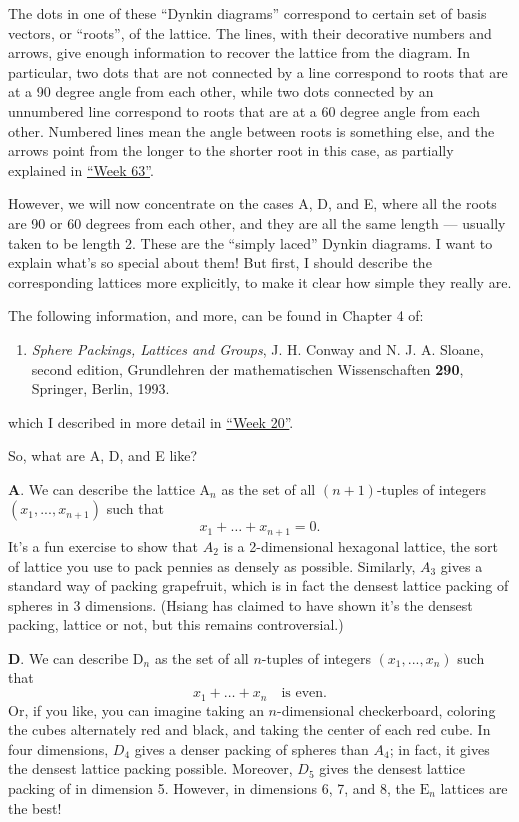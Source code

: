 \documentclass{article}
\def\tightlist{}
\begin{document}
The dots in one of these ``Dynkin diagrams'' correspond to certain set
of basis vectors, or ``roots'', of the lattice. The lines, with their
decorative numbers and arrows, give enough information to recover the
lattice from the diagram. In particular, two dots that are not connected
by a line correspond to roots that are at a 90 degree angle from each
other, while two dots connected by an unnumbered line correspond to
roots that are at a 60 degree angle from each other. Numbered lines mean
the angle between roots is something else, and the arrows point from the
longer to the shorter root in this case, as partially explained in
\protect\hyperlink{week63}{``Week 63''}.

However, we will now concentrate on the cases A, D, and E, where all the
roots are 90 or 60 degrees from each other, and they are all the same
length --- usually taken to be length 2. These are the ``simply laced''
Dynkin diagrams. I want to explain what's so special about them! But
first, I should describe the corresponding lattices more explicitly, to
make it clear how simple they really are.

The following information, and more, can be found in Chapter 4 of:

\begin{enumerate}
\def\labelenumi{\arabic{enumi})}
\tightlist
\item
  \emph{Sphere Packings, Lattices and Groups}, J. H. Conway and N. J. A.
  Sloane, second edition, Grundlehren der mathematischen Wissenschaften
  \textbf{290}, Springer, Berlin, 1993.
\end{enumerate}

which I described in more detail in \protect\hyperlink{week20}{``Week
20''}.

So, what are A, D, and E like?

\textbf{A}. We can describe the lattice \(\mathrm{A}_n\) as the set of
all \((n+1)\)-tuples of integers \((x_1,...,x_{n+1})\) such that
\[x_1+\ldots+x_{n+1}=0.\] It's a fun exercise to show that \(A_2\) is a
2-dimensional hexagonal lattice, the sort of lattice you use to pack
pennies as densely as possible. Similarly, \(A_3\) gives a standard way
of packing grapefruit, which is in fact the densest lattice packing of
spheres in 3 dimensions. (Hsiang has claimed to have shown it's the
densest packing, lattice or not, but this remains controversial.)

\textbf{D}. We can describe \(\mathrm{D}_n\) as the set of all
\(n\)-tuples of integers \((x_1,...,x_n)\) such that
\[x_1+\ldots+x_n\quad\text{is even}.\] Or, if you like, you can imagine
taking an \(n\)-dimensional checkerboard, coloring the cubes alternately
red and black, and taking the center of each red cube. In four
dimensions, \(D_4\) gives a denser packing of spheres than \(A_4\); in
fact, it gives the densest lattice packing possible. Moreover, \(D_5\)
gives the densest lattice packing of in dimension 5. However, in
dimensions 6, 7, and 8, the \(\mathrm{E}_n\) lattices are the best!
\end{document}
